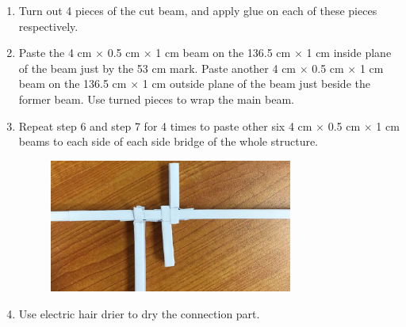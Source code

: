 \begin{enumerate}
\begin{enumerate}
	\item Turn out 4 pieces of the cut beam, and apply glue on each of these pieces respectively. 
	\item Paste the 4 cm $\times$ 0.5 cm $\times$ 1 cm beam on the 136.5 cm  $\times$ 1 cm inside plane of the beam just by the 53 cm mark. Paste another 4 cm $\times$ 0.5 cm $\times$ 1 cm beam on the 136.5 cm  $\times$ 1 cm outside plane of the beam just beside the former beam. Use turned pieces to wrap the main beam. 
	\item Repeat step 6 and step 7 for 4 times to paste other six 4 cm $\times$ 0.5 cm $\times$ 1 cm beams to each side of each side bridge of the whole structure. 
	\begin{figure}[H]
	\begin{center}
	\includegraphics[width=8cm]{figure/procedureBridge/p6}
	\end{center}
	\end{figure}
	\item Use electric hair drier to dry the connection part. 
	\end{enumerate}
\end{enumerate}

%
%

